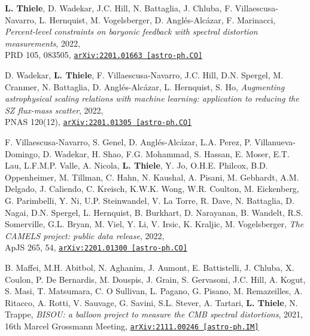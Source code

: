 \begin{minipage}{\textwidth}
{\bf L. Thiele}, D. Wadekar, J.C. Hill, N. Battaglia, J. Chluba,
F. Villaescusa-Navarro, L. Hernquist, M. Vogelsberger, D. Angl\'es-Alc\'azar,
F. Marinacci,
\emph{Percent-level constraints on baryonic feedback with spectral distortion
      measurements}, 2022,\\
PRD 105, 083505,
\href{https://arxiv.org/abs/2201.01663}{\mbox{\texttt{arXiv:2201.01663 [astro-ph.CO]}}}
\end{minipage}

\begin{minipage}{\textwidth}
D. Wadekar, {\bf L. Thiele}, F. Villaescusa-Navarro, J.C. Hill, D.N. Spergel,
M. Cranmer, N. Battaglia, D. Angl\'es-Alc\'azar, L. Hernquist, S. Ho,
\emph{Augmenting astrophysical scaling relations with machine learning:
      application to reducing the SZ flux-mass scatter}, 2022,\\
PNAS 120(12),
\href{https://arxiv.org/abs/2201.01305}{\mbox{\texttt{arXiv:2201.01305 [astro-ph.CO]}}}
\end{minipage}

\begin{minipage}{\textwidth}
F. Villaescusa-Navarro, S. Genel, D. Angl\'es-Alc\'azar,
L.A. Perez, P. Villanueva-Domingo, D. Wadekar, H. Shao,
F.G. Mohammad, S. Hassan, E. Moser, E.T. Lau, L.F.M.P. Valle, A. Nicola,
{\bf L. Thiele}, Y. Jo, O.H.E. Philcox, B.D. Oppenheimer, M. Tillman, C. Hahn,
N. Kaushal, A. Pisani, M. Gebhardt, A.M. Delgado, J. Caliendo,
C. Kreisch, K.W.K. Wong, W.R. Coulton, M. Eickenberg,
G. Parimbelli, Y. Ni, U.P. Steinwandel, V. La Torre,
R. Dave, N. Battaglia, D. Nagai, D.N. Spergel, L. Hernquist, B. Burkhart,
D. Narayanan, B. Wandelt, R.S. Somerville, G.L. Bryan, M. Viel, Y. Li, V. Irsic,
K. Kraljic, M. Vogelsberger,
\emph{The CAMELS project: public data release}, 2022,\\
ApJS 265, 54,
\href{https://arxiv.org/abs/2201.01300}{\mbox{\texttt{arXiv:2201.01300 [astro-ph.CO]}}}
\end{minipage}

\begin{minipage}{\textwidth}
B. Maffei, M.H. Abitbol, N. Aghanim, J. Aumont, E. Battistelli, J. Chluba,
X. Coulon, P. De Bernardis, M. Douspis, J. Grain, S. Gervasoni, J.C. Hill,
A. Kogut, S. Masi, T. Matsumara, C. O Sullivan, L. Pagano, G. Pisano,
M. Remazeilles, A. Ritacco, A. Rotti, V. Sauvage, G. Savini, S.L. Stever,
A. Tartari, {\bf L. Thiele}, N. Trappe,
\emph{BISOU: a balloon project to measure the CMB spectral distortions}, 2021,\\
16th Marcel Grossmann Meeting,
\href{https://arxiv.org/abs/2111.00246}{\mbox{\texttt{arXiv:2111.00246 [astro-ph.IM]}}}
\end{minipage}

